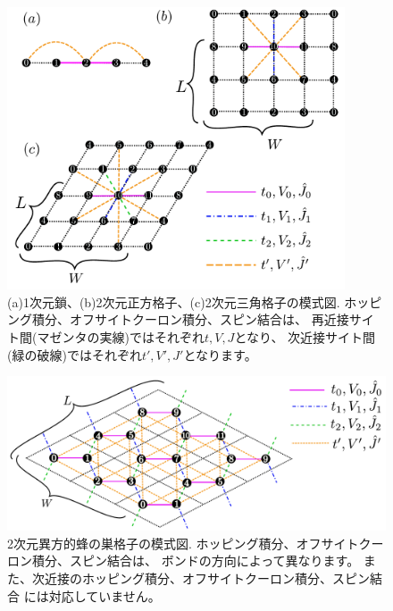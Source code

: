 \begin{itemize}
\begin{figure}[!htbp]
  \begin{center}
    \includegraphics[width=10cm]{../figs/chap04_1_lattice.pdf}
    \caption{(a)1次元鎖、(b)2次元正方格子、(c)2次元三角格子の模式図. 
      ホッピング積分、オフサイトクーロン積分、スピン結合は、
      再近接サイト間(マゼンタの実線)ではそれぞれ$t,V,J$となり、
      次近接サイト間(緑の破線)ではそれぞれ$t',V',J'$となります。}
    \label{fig_chap04_1_lattice}
  \end{center}
\end{figure}

\begin{figure}[!htbp]
  \begin{center}
    \includegraphics[width=15cm]{../figs/chap04_1_honeycomb.pdf}
    \caption{2次元異方的蜂の巣格子の模式図. 
      ホッピング積分、オフサイトクーロン積分、スピン結合は、
      ボンドの方向によって異なります。
      また、次近接のホッピング積分、オフサイトクーロン積分、スピン結合
      には対応していません。
    }
    \label{fig_chap04_1_honeycomb}
  \end{center}
\end{figure}


\end{itemize}
